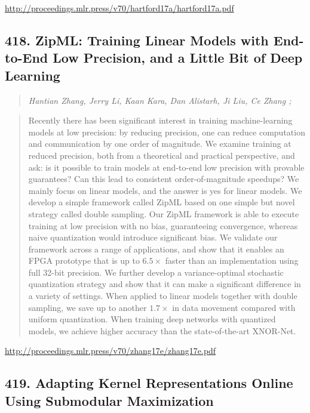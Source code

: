 \documentclass{article}
\begin{document}
\href{http://proceedings.mlr.press/v70/hartford17a/hartford17a.pdf}{http://proceedings.mlr.press/v70/hartford17a/hartford17a.pdf}

\subsection{418. ZipML: Training Linear Models with End-to-End Low Precision, and a Little Bit of Deep Learning}

\begin{quote}
\footnotesize{\textit{Hantian Zhang, Jerry Li, Kaan Kara, Dan Alistarh, Ji Liu, Ce Zhang ;}}
\end{quote}

\begin{quote}
    Recently there has been significant interest in training machine-learning models at low precision: by reducing precision, one can reduce computation and communication by one order of magnitude. We examine training at reduced precision, both from a theoretical and practical perspective, and ask: is it possible to train models at end-to-end low precision with provable guarantees? Can this lead to consistent order-of-magnitude speedups? We mainly focus on linear models, and the answer is yes for linear models. We develop a simple framework called ZipML based on one simple but novel strategy called double sampling. Our ZipML framework is able to execute training at low precision with no bias, guaranteeing convergence, whereas naive quantization would introduce significant bias. We validate our framework across a range of applications, and show that it enables an FPGA prototype that is up to $6.5\times$ faster than an implementation using full 32-bit precision. We further develop a variance-optimal stochastic quantization strategy and show that it can make a significant difference in a variety of settings. When applied to linear models together with double sampling, we save up to another $1.7\times$ in data movement compared with uniform quantization. When training deep networks with quantized models, we achieve higher accuracy than the state-of-the-art XNOR-Net.  \end{quote}

\href{http://proceedings.mlr.press/v70/zhang17e/zhang17e.pdf}{http://proceedings.mlr.press/v70/zhang17e/zhang17e.pdf}

\subsection{419. Adapting Kernel Representations Online Using Submodular Maximization}
\end{document}
